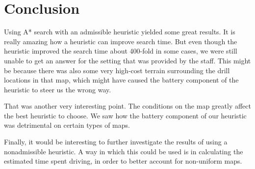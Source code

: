 \section{Conclusion}

Using A* search with an admissible heuristic yielded some great results. It is really amazing how a heuristic
can improve search time. But even though the heuristic improved the search time about 400-fold in some
cases, we were still unable to get an answer for the setting that was provided by the staff. This might be 
because there was also some very high-cost terrain surrounding the drill locations in that map, which might
have caused the battery component of the heuristic to steer us the wrong way.

That was another very interesting point. The conditions on the map greatly affect the best heuristic to
choose. We saw how the battery component of our heuristic was detrimental on certain types of maps.

Finally, it would be interesting to further investigate the results of using a nonadmissible heuristic. A way in
which this could be used is in calculating the estimated time spent driving, in order to better account for
non-uniform maps.